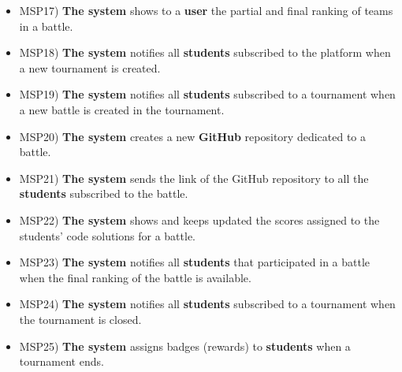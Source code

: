\begin{itemize}
		\item MSP17) \textbf{The system} shows to a \textbf{user} the partial and final ranking of teams in a battle.
		\item MSP18) \textbf{The system} notifies all \textbf{students} subscribed to the platform when a new tournament is created.
		\item MSP19) \textbf{The system} notifies all \textbf{students} subscribed to a tournament when a new battle is created in the tournament.
		\item MSP20) \textbf{The system} creates a new \textbf{GitHub} repository dedicated to a battle.
		\item MSP21) \textbf{The system} sends the link of the GitHub repository to all the \textbf{students} subscribed to the battle.
		\item MSP22) \textbf{The system} shows and keeps updated the scores assigned to the students' code solutions for a battle.
		\item MSP23) \textbf{The system} notifies all \textbf{students} that participated in a battle when the final ranking of the battle is available.
		\item MSP24) \textbf{The system} notifies all \textbf{students} subscribed to a tournament when the tournament is closed.
		\item MSP25) \textbf{The system} assigns badges (rewards) to \textbf{students} when a tournament ends.
	\end{itemize}